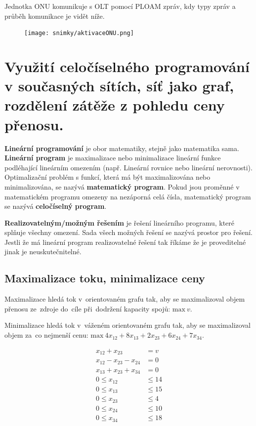 Jednotka ONU komunikuje s OLT pomocí PLOAM zpráv, kdy typy zpráv a průběh komunikace je vidět níže.

\begin{figure} [h]
    \centering
    \texttt{[image: snimky/aktivaceONU.png]}
\end{figure}


\clearpage
\section{Využití celočíselného programování v současných sítích, síť jako graf, rozdělení zátěže z pohledu ceny přenosu.}
\textbf{Lineární programování} je obor matematiky, stejně jako matematika sama. \textbf{Lineární program} je maximalizace nebo minimalizace lineární funkce podléhající lineárním omezením (např. Lineární rovnice nebo lineární nerovnosti). Optimalizační problém s funkcí, která má být maximalizována nebo minimalizována, se nazývá \textbf{matematický program}. Pokud jsou proměnné v matematickém programu omezeny na nezáporná celá čísla, matematický program se nazývá \textbf{celočíselný program}.

\textbf{Realizovatelným/možným řešením} je řešení lineárního programu, které splňuje všechny omezení. Sada všech možných řešení se nazývá prostor pro řešení. Jestli že má lineární program realizovatelné řešení tak říkáme že je proveditelné jinak je neuskutečnitelné.

\subsection{Maximalizace toku, minimalizace ceny}

Maximalizace hledá tok v~orientovaném grafu tak, aby se maximalizoval objem přenosu ze~zdroje do~cíle při~dodržení kapacity spojů:
$\text{max}~v$.

Minimalizace hledá tok v~váženém orientovaném grafu tak, aby se maximalizoval objem za~co nejmenší cenu:
$\text{max}\ 4x_{12} + 8x_{13} + 2x_{23} + 6x_{24} + 7x_{34}$.

\begin{center}\begin{minipage}{0.3\textwidth}
        \begin{align}
            x_{12} + x_{23}          & = v     \\
            x_{12} - x_{23} - x_{24} & = 0     \\
            x_{13} + x_{23} + x_{34} & = 0     \\
            0 \leq x_{12}            & \leq 14 \\
            0 \leq x_{13}            & \leq 15 \\
            0 \leq x_{23}            & \leq 4  \\
            0 \leq x_{24}            & \leq 10 \\
            0 \leq x_{34}            & \leq 18
        \end{align}
    \end{minipage}\end{center}

